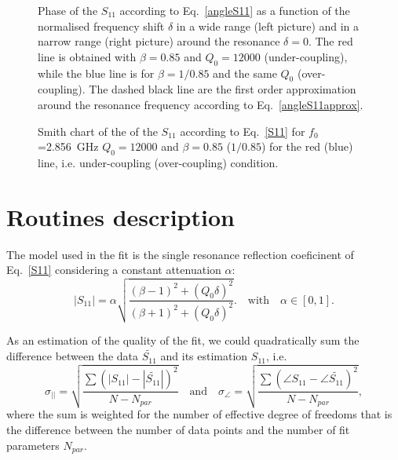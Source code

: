 \documentclass[aps,onecolumn,floatfix,superscriptaddress,a4]{revtex4}
\begin{document}
\begin{figure}[!htbp]
\label{fig:absS11}
\centering
{}
\caption{
Phase of the $S_{11}$ according to Eq.~\ref{angleS11} as a function of the normalised
frequency shift $\delta$ in a wide range (left picture) and in a narrow range (right picture)
around the resonance $\delta=0$. The red line is obtained with $\beta=0.85$ and $Q_0=12000$
(under-coupling), while the blue line is for $\beta=1/0.85$ and the same $Q_0$ (over-coupling).
The dashed black line are the first order approximation around the resonance frequency
according to Eq.~\ref{angleS11approx}.
}
\end{figure}

\begin{figure}[!htbp]
\label{fig:absS11}
\centering
{}
\caption{
Smith chart of the of the $S_{11}$ according to Eq.~\ref{S11} for $f_0$=2.856~GHz $Q_0=12000$
and $\beta=0.85$ ($1/0.85$) for the red (blue) line, i.e. under-coupling (over-coupling) condition.
}
\end{figure}


\section{Routines description}
The model used in the fit is the single resonance reflection coeficinent of Eq.~\ref{S11}
considering a constant attenuation $\alpha$:
\begin{equation}
\left|S_{11}\right|=\alpha
\sqrt{\frac{(\beta-1)^2+(Q_0 \delta)^2}{(\beta+1)^2+(Q_0 \delta)^2}}.
\quad \mbox{with} \quad
\alpha \in [0,1].
\label{S11alpha}
\end{equation}

As an estimation of the quality of the fit, we could quadratically sum the difference between
the  data $\widetilde{S_{11}}$ and its estimation $S_{11}$, i.e.
\begin{equation}
\sigma_{||}=
\sqrt{\frac{\sum \left(\left|S_{11}\right|-\left|\widetilde{S_{11}}\right| \right)^2}{N-N_{par}}}
\quad \mbox{and} \quad
\sigma_{\angle}=
\sqrt{\frac{\sum \left(\angle S_{11} -\angle \widetilde{S_{11}} \right)^2 }{N-N_{par}}},
\end{equation}
where the sum is weighted for the number of effective degree of freedoms that is the difference
between the number of data points and the number of fit parameters $N_{par}$.
\end{document}
